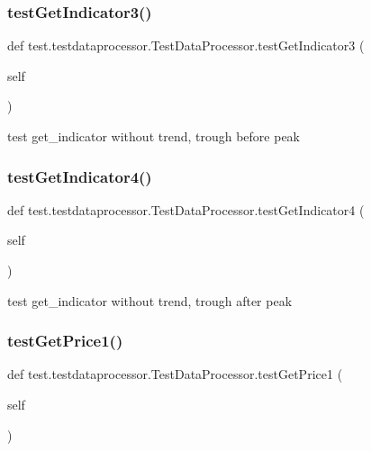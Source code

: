 \subsubsection{\texorpdfstring{test\+Get\+Indicator3()}{testGetIndicator3()}}
{\footnotesize\ttfamily def test.\+testdataprocessor.\+Test\+Data\+Processor.\+test\+Get\+Indicator3 (\begin{DoxyParamCaption}\item[{}]{self }\end{DoxyParamCaption})}

\begin{DoxyVerb}test get_indicator without trend, trough before peak\end{DoxyVerb}
 \mbox{\label{classtest_1_1testdataprocessor_1_1TestDataProcessor_a47dce81eea21d9be9b356d3a01009a00}} 
\subsubsection{\texorpdfstring{test\+Get\+Indicator4()}{testGetIndicator4()}}
{\footnotesize\ttfamily def test.\+testdataprocessor.\+Test\+Data\+Processor.\+test\+Get\+Indicator4 (\begin{DoxyParamCaption}\item[{}]{self }\end{DoxyParamCaption})}

\begin{DoxyVerb}test get_indicator without trend, trough after peak\end{DoxyVerb}
 \mbox{\label{classtest_1_1testdataprocessor_1_1TestDataProcessor_a5e277ac5b340c6bb491eff36a6000f56}} 
\subsubsection{\texorpdfstring{test\+Get\+Price1()}{testGetPrice1()}}
{\footnotesize\ttfamily def test.\+testdataprocessor.\+Test\+Data\+Processor.\+test\+Get\+Price1 (\begin{DoxyParamCaption}\item[{}]{self }\end{DoxyParamCaption})}

